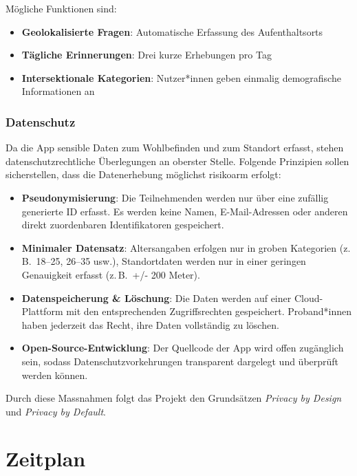 \documentclass{template}
\begin{document}
Mögliche Funktionen sind:
\begin{itemize}
    \item \textbf{Geolokalisierte Fragen}: Automatische Erfassung des Aufenthaltsorts
    \item \textbf{Tägliche Erinnerungen}: Drei kurze Erhebungen pro Tag
    \item \textbf{Intersektionale Kategorien}: Nutzer*innen geben einmalig demografische Informationen an
\end{itemize}

\subsubsection{Datenschutz}
Da die App sensible Daten zum Wohlbefinden und zum Standort erfasst, stehen datenschutzrechtliche Überlegungen an oberster Stelle. Folgende Prinzipien sollen sicherstellen, dass die Datenerhebung möglichst risikoarm erfolgt:

\begin{itemize}
    \item \textbf{Pseudonymisierung}: Die Teilnehmenden werden nur über eine zufällig generierte ID erfasst. Es werden keine Namen, E-Mail-Adressen oder anderen direkt zuordenbaren Identifikatoren gespeichert.
    \item \textbf{Minimaler Datensatz}: Altersangaben erfolgen nur in groben Kategorien (z.\,B.\ 18–25, 26–35 usw.), Standortdaten werden nur in einer geringen Genauigkeit erfasst (z.\,B.\ +/- 200 Meter).
    \item \textbf{Datenspeicherung \& Löschung}: Die Daten werden auf einer Cloud-Plattform mit den entsprechenden Zugriffsrechten gespeichert. Proband*innen haben jederzeit das Recht, ihre Daten vollständig zu löschen.
    \item \textbf{Open-Source-Entwicklung}: Der Quellcode der App wird offen zugänglich sein, sodass Datenschutzvorkehrungen transparent dargelegt und überprüft werden können.
\end{itemize}

Durch diese Massnahmen folgt das Projekt den Grundsätzen \textit{Privacy by Design} und \textit{Privacy by Default}.

\section{Zeitplan}
\end{document}
